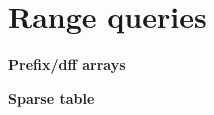 \section{Range queries}
    \textbf{Prefix/dff arrays}
    

    

    

    \textbf{Sparse table}
    